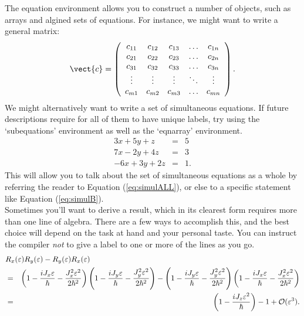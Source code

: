 The equation environment allows you to construct a number of objects, such as arrays and algined sets of equations. For instance, we might want to write a general matrix:
\begin{equation}
\vect{c} = 
  \left(\begin{array}{c c c c c}
    c_{11} & c_{12} & c_{13} & \ldots & c_{1n} \\
    c_{21} & c_{22} & c_{23} & \ldots & c_{2n} \\
    c_{31} & c_{32} & c_{33} & \ldots & c_{3n} \\
    \vdots & \vdots & \vdots & \ddots & \vdots \\
    c_{m1} & c_{m2} & c_{m3} & \ldots & c_{mn} \\
  \end{array}\right).
\end{equation}
We might alternatively want to write a set of simultaneous equations. If future descriptions require for all of them to have unique labels, try using the `subequations' environment as well as the `eqnarray' environment.
\begin{subequations}\label{eq:simulALL}
\begin{eqnarray}
 3x + 5y +  z &=& 5\\ \label{eq:simulB}
 7x - 2y + 4z &=& 3\\
-6x + 3y + 2z &=& 1.
\end{eqnarray}
\end{subequations}
This will allow you to talk about the set of simultaneous equations as a whole by referring the reader to Equation (\ref{eq:simulALL}), or else to a specific statement like Equation (\ref{eq:simulB}).\\

Sometimes you'll want to derive a result, which in its clearest form requires more than one line of algebra. There are a few ways to accomplish this, and the best choice will depend on the task at hand and your personal taste. You can instruct the compiler \textit{not} to give a label to one or more of the lines as you go.
\begin{eqnarray}\notag
\lefteqn{R_{x} (\varepsilon) R_{y} (\varepsilon) - R_{y} (\varepsilon) R_{x} (\varepsilon)} \\ \notag
& = &  \left( 1 - \frac{i J_{x} \varepsilon}{\hbar} - \frac{J_{x}^{2} \varepsilon^{2}}{2 \hbar^{2}} \right) 
 \left( 1 - \frac{i J_{y} \varepsilon}{\hbar} - \frac{J_{y}^{2} \varepsilon^{2}}{2 \hbar^{2}} \right) - 
 \left( 1 - \frac{i J_{y} \varepsilon}{\hbar} - \frac{J_{y}^{2} \varepsilon^{2}}{2 \hbar^{2}} \right)
 \left( 1 - \frac{i J_{x} \varepsilon}{\hbar} - \frac{J_{x}^{2} \varepsilon^{2}}{2 \hbar^{2}} \right) \\
& = &  \left( 1 - \frac{i J_{z} \varepsilon^{2}}{\hbar} \right) - 1 + \mathcal{O} (\varepsilon^{3}). 
\end{eqnarray}

